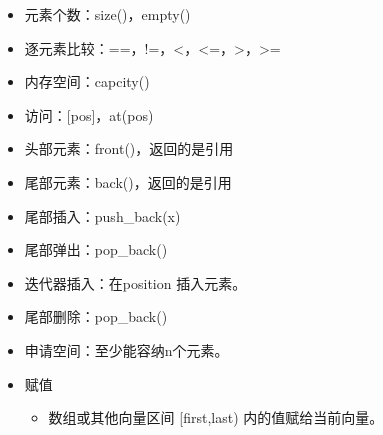 \documentclass[letterpaper,10pt,english]{sphinxmanual}
\begin{document}
\begin{itemize}
\item {} 
元素个数：size()，empty()

\item {} 
逐元素比较：==，!=，\textless{}，\textless{}=，\textgreater{}，\textgreater{}=

\item {} 
内存空间：capcity()

\item {} 
访问：{[}pos{]}，at(pos)

\item {} 
头部元素：front()，返回的是引用

\item {} 
尾部元素：back()，返回的是引用

\item {} 
尾部插入：push\_back(x)

\item {} 
尾部弹出：pop\_back()

\item {} 
迭代器插入：在position  插入元素。

%
\begin{sphinxVerbatim}[commandchars=\\\{\}]
      
\end{sphinxVerbatim}

\item {} 
尾部删除：pop\_back()

\item {} 
申请空间：至少能容纳n个元素。

%
\begin{sphinxVerbatim}[commandchars=\\\{\}]
   
\end{sphinxVerbatim}

\item {} 
赋值
\begin{itemize}
\item {} 
数组或其他向量区间 {[}first,last) 内的值赋给当前向量。

%
\begin{sphinxVerbatim}[commandchars=\\\{\}]
  
     
\end{sphinxVerbatim}


\end{itemize}
\end{itemize}
\end{document}
